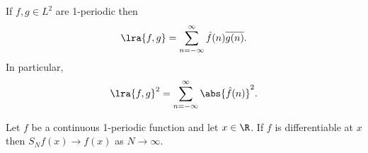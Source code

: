 \documentclass{article}
\begin{document}
\begin{corollary}
	If $f,g\in L^2$ are 1-periodic then 
	\begin{align*}
		\lra{f,g} = \sum_{n=-\infty}^\infty \hat f(n)\overline{g(n)}.
	\end{align*}	
	In particular,
	\begin{align*}
		\lra{f,g}^2 = \sum_{n=-\infty}^\infty \abs{\hat f(n)}^2.
	\end{align*}
\end{corollary}

\begin{theorem}
	Let $f$ be a continuous 1-periodic function and let $x\in\R$. If $f$ is differentiable
	at $x$ then $S_Nf(x)\to f(x)$ as $N\to\infty$.
\end{theorem}
\end{document}
